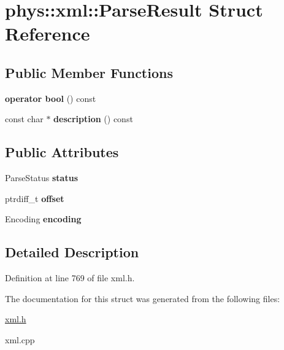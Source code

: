 \hypertarget{structphys_1_1xml_1_1ParseResult}{
\section{phys::xml::ParseResult Struct Reference}
\label{d5/dea/structphys_1_1xml_1_1ParseResult}
}
\subsection*{Public Member Functions}
\begin{DoxyCompactItemize}
\item 
\hypertarget{structphys_1_1xml_1_1ParseResult_a95c9989865c1bace7846995166a13e31}{
{\bfseries operator bool} () const }
\label{d5/dea/structphys_1_1xml_1_1ParseResult_a95c9989865c1bace7846995166a13e31}

\item 
\hypertarget{structphys_1_1xml_1_1ParseResult_a7bab3a3dc95653189b6d0952f2153aa5}{
const char $\ast$ {\bfseries description} () const }
\label{d5/dea/structphys_1_1xml_1_1ParseResult_a7bab3a3dc95653189b6d0952f2153aa5}

\end{DoxyCompactItemize}
\subsection*{Public Attributes}
\begin{DoxyCompactItemize}
\item 
\hypertarget{structphys_1_1xml_1_1ParseResult_afe00d4fd255ddc78d623e3648ef520e8}{
ParseStatus {\bfseries status}}
\label{d5/dea/structphys_1_1xml_1_1ParseResult_afe00d4fd255ddc78d623e3648ef520e8}

\item 
\hypertarget{structphys_1_1xml_1_1ParseResult_afa03d9b88e7d2e181dcb25ed7890a85c}{
ptrdiff\_\-t {\bfseries offset}}
\label{d5/dea/structphys_1_1xml_1_1ParseResult_afa03d9b88e7d2e181dcb25ed7890a85c}

\item 
\hypertarget{structphys_1_1xml_1_1ParseResult_ade3b37d8061fe4aeb753887408766589}{
Encoding {\bfseries encoding}}
\label{d5/dea/structphys_1_1xml_1_1ParseResult_ade3b37d8061fe4aeb753887408766589}

\end{DoxyCompactItemize}


\subsection{Detailed Description}


Definition at line 769 of file xml.h.



The documentation for this struct was generated from the following files:\begin{DoxyCompactItemize}
\item 
\hyperlink{xml_8h}{xml.h}\item 
xml.cpp\end{DoxyCompactItemize}
